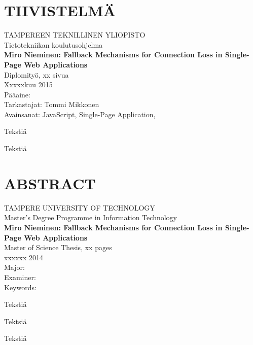 \newpage
 
\setcounter{page}{1} %
 
\chapter*{TIIVISTELMÄ}
\begin{spacing}{1.0}
\textsf{TAMPEREEN TEKNILLINEN YLIOPISTO}\\
\textsf{Tietotekniikan koulutusohjelma}\\
{\bf \textsf{Miro Nieminen: Fallback Mechanisms for Connection Loss in Single-Page Web Applications}}\\
\textsf{Diplomityö, xx sivua}\\
\textsf{Xxxxxkuu 2015}\\
\textsf{Pääaine: }\\
\textsf{Tarkastajat: Tommi Mikkonen}\\
\textsf{Avainsanat: JavaScript, Single-Page Application, }\\
\end{spacing}
 
\noindent
Tekstiä
 
\noindent
Tekstiä

\newpage
\chapter*{ABSTRACT}
\begin{spacing}{1.0}
\textsf{TAMPERE UNIVERSITY OF TECHNOLOGY}\\
\textsf{Master's Degree Programme in Information Technology}\\
{\bf \textsf{Miro Nieminen: Fallback Mechanisms for Connection Loss in Single-Page Web Applications}}\\
\textsf{Master of Science Thesis, xx pages}\\
\textsf{xxxxxx 2014}\\
\textsf{Major: }\\
\textsf{Examiner: }\\
\textsf{Keywords: }\\
\end{spacing}
 
\noindent
Tekstiä
 
\noindent
Tektsiä

\noindent
Tekstiä

